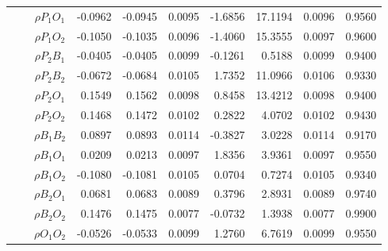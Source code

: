 \documentclass[letterpaper]{article}
\begin{document}
\begin{table}[h]
\begin{tabular}{cccrrrrrrr}
            &             & $\rho{P_1O_1}$ & -0.0962                & -0.0945                & 0.0095                 & -1.6856                & 17.1194                & 0.0096                   & 0.9560                 \\
            &             & $\rho{P_1O_2}$ & -0.1050                & -0.1035                & 0.0096                 & -1.4060                & 15.3555                & 0.0097                   & 0.9600                 \\
            &             & $\rho{P_2B_1}$ & -0.0405                & -0.0405                & 0.0099                 & -0.1261                & 0.5188                 & 0.0099                   & 0.9400                 \\
            &             & $\rho{P_2B_2}$ & -0.0672                & -0.0684                & 0.0105                 & 1.7352                 & 11.0966                & 0.0106                   & 0.9330                 \\
            &             & $\rho{P_2O_1}$ & 0.1549                 & 0.1562                 & 0.0098                 & 0.8458                 & 13.4212                & 0.0098                   & 0.9400                 \\
            &             & $\rho{P_2O_2}$ & 0.1468                 & 0.1472                 & 0.0102                 & 0.2822                 & 4.0702                 & 0.0102                   & 0.9430                 \\
            &             & $\rho{B_1B_2}$ & 0.0897                 & 0.0893                 & 0.0114                 & -0.3827                & 3.0228                 & 0.0114                   & 0.9170                 \\
            &             & $\rho{B_1O_1}$ & 0.0209                 & 0.0213                 & 0.0097                 & 1.8356                 & 3.9361                 & 0.0097                   & 0.9550                 \\
            &             & $\rho{B_1O_2}$ & -0.1080                & -0.1081                & 0.0105                 & 0.0704                 & 0.7274                 & 0.0105                   & 0.9340                 \\
            &             & $\rho{B_2O_1}$ & 0.0681                 & 0.0683                 & 0.0089                 & 0.3796                 & 2.8931                 & 0.0089                   & 0.9740                 \\
            &             & $\rho{B_2O_2}$ & 0.1476                 & 0.1475                 & 0.0077                 & -0.0732                & 1.3938                 & 0.0077                   & 0.9900                 \\
            &             & $\rho{O_1O_2}$ & -0.0526                & -0.0533                & 0.0099                 & 1.2760                 & 6.7619                 & 0.0099                   & 0.9550                 \\  \hline
\end{tabular}
\end{table}
\end{document}
